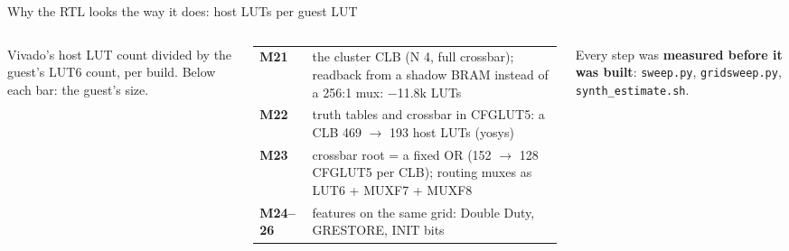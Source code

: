 \documentclass[aspectratio=169,11pt]{beamer}
\newcommand{\src}[1]{{\scriptsize\color{bobmute}#1}}
\begin{document}
\begin{frame}{Why the RTL looks the way it does: host LUTs per guest LUT}
  \begin{columns}[c]
    \centering

    \src{Vivado's host LUT count divided by the guest's LUT6 count, per build. Below each bar: the guest's size.}
    \scriptsize
    \begin{tabular}{@{}L{10mm}L{50mm}@{}}
      \toprule
      \textbf{M21} & the cluster CLB (N 4, full crossbar); readback from a shadow BRAM instead of a 256:1 mux: $-$11.8k LUTs \\
      \textbf{M22} & truth tables and crossbar in CFGLUT5: a CLB 469 $\rightarrow$ 193 host LUTs (yosys) \\
      \textbf{M23} & crossbar root = a fixed OR (152 $\rightarrow$ 128 CFGLUT5 per CLB); routing muxes as LUT6 + MUXF7 + MUXF8 \\
      \textbf{M24--26} & features on the same grid: Double Duty, GRESTORE, INIT bits \\
      \bottomrule
    \end{tabular}
    \vspace{2mm}

    Every step was \textbf{measured before it was built}: \texttt{sweep.py}, \texttt{gridsweep.py}, \texttt{synth\_estimate.sh}.
  \end{columns}
\end{frame}
\end{document}
